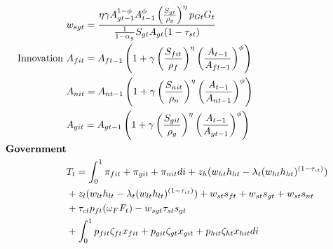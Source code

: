 \begin{align*}
&
w_{sgt}=\frac{\eta \gamma  A_{gt-1}^{1-\phi}A_{t-1}^{\phi}\left(\frac{S_{gt}}{\rho_g}\right)^{\eta}p_{Gt}G_t}{\frac{1}{1-\alpha_g}S_{gt}A_{gt}(1-\tau_{st})}\\
\text{Innovation}\ \vspace{4mm}&
A_{fit}=A_{ft-1}\left(1+\gamma\left(\frac{S_{fit}}{\rho_f}\right)^{\eta}\left(\frac{A_{t-1}}{A_{ft-1}}\right)^{\phi}\right) \\
&
A_{nit}=A_{nt-1}\left(1+\gamma\left(\frac{S_{nit}}{\rho_n}\right)^{\eta}\left(\frac{A_{t-1}}{A_{nt-1}}\right)^{\phi}\right) \\
&
A_{git}=A_{gt-1}\left(1+\gamma\left(\frac{S_{git}}{\rho_g}\right)^{\eta}\left(\frac{A_{t-1}}{A_{gt-1}}\right)^{\phi}\right) \\
\text{\textbf{Government}}&\\
&T_t=\int_{0}^{1}\pi_{fit}+\pi_{git}+\pi_{nit}di+z_h(w_{ht}h_{ht}-\lambda_t(w_{ht}h_{ht})^{(1-\tau_{\iota t})})\\&+z_l(w_{lt}h_{lt}-\lambda_t(w_{lt}h_{lt})^{(1-\tau_{\iota t})})+w_{st}s_{ft}+w_{st}s_{gt}+w_{st}s_{nt}\\ &+\tau_{ct}p_{ft}(\omega_FF_t)-w_{sgt}\tau_{st}s_{gt} \\ &+\int_{0}^{1} p_{fit}\zeta_{ft}x_{fit}+p_{git}\zeta_{gt}x_{git}+ p_{hit}\zeta_{ht}x_{hit}di\\

\end{align*}
